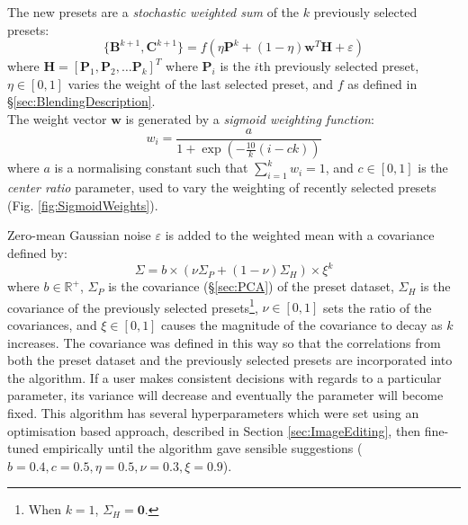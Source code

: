 \documentclass[11pt, oneside]{report}   	%
\renewcommand{\vec}[1]{\mathbf{#1}}
\begin{document}
The new presets are a \emph{stochastic weighted sum} of the $k$ previously selected presets:
\begin{equation}
\{\vec{B}^{k+1}, \vec{C}^{k+1}\} = f(\eta\vec{P}^k + (1-\eta)\vec{w}^T\vec{H} + \varepsilon) 
\end{equation}
where  $\vec{H} = [\vec{P}_1, \vec{P}_2, \dots \vec{P}_k]^T$ where $\vec{P}_i$ is the $i$th previously selected preset, $\eta\in[0, 1]$ varies the weight of the last selected preset, and $f$ as defined in \S \ref{sec:BlendingDescription}.\\
 The weight vector $\vec{w}$ is generated by a \emph{sigmoid weighting function}:
\begin{equation}
	w_i = \frac{a}{1 + \exp\left(-\frac{10}{k}(i-ck)\right)}
\end{equation}
where $a$ is a normalising constant such that $\sum_{i=1}^{k}w_i =1$, and $c\in [0, 1]$ is the \emph{center ratio} parameter, used to vary the weighting of recently selected presets (Fig. \ref{fig:SigmoidWeights}).

Zero-mean Gaussian noise $\varepsilon$ is added to the weighted mean with a covariance defined by:
\begin{equation}
\Sigma = b\times(\nu\Sigma_P + (1-\nu)\Sigma_H)\times\xi^k
\end{equation}
where $b\in\mathbb{R}^+$, $\Sigma_P$ is the covariance (\S \ref{sec:PCA}) of the preset dataset, $\Sigma_H$ is the covariance of the previously selected presets\footnote{When $k =1$, $\Sigma_H = \vec{0}$.}, $\nu \in [0, 1]$ sets the ratio of the covariances, and $\xi \in [0, 1]$ causes the magnitude of the covariance to decay as $k$ increases. The covariance was defined in this way so that the correlations from both the preset dataset and the previously selected presets are incorporated into the algorithm. If a user makes consistent decisions with regards to a particular parameter, its variance will decrease and eventually the parameter will become fixed. This algorithm has several hyperparameters which were set using an optimisation based approach, described in Section \ref{sec:ImageEditing}, then fine-tuned empirically until the algorithm gave sensible suggestions ($b=0.4, c=0.5, \eta=0.5,  \nu=0.3, \xi=0.9$).
\vspace{-8pt}
\end{document}
